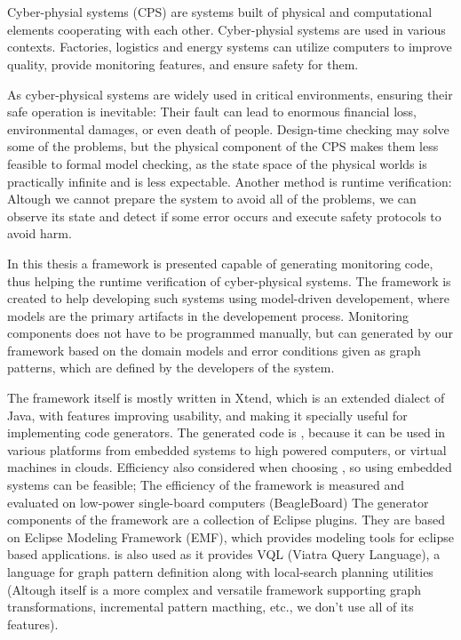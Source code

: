 \chapter{\bevezetes}

Cyber-physial systems (CPS) are systems built of physical and computational elements cooperating with each other.
Cyber-physial systems are used in various contexts. 
Factories, logistics and energy systems can utilize computers to improve quality, provide monitoring features, and ensure safety for them.

As cyber-physical systems are widely used in critical environments, ensuring their safe operation is inevitable: Their fault can lead to enormous financial loss, environmental damages, or even death of people.
Design-time checking may solve some of the problems, but the physical component of the CPS makes them less feasible to formal model checking, as the state space of the physical worlds is practically infinite and is less expectable.
Another method is runtime verification: Altough we cannot prepare the system to avoid all of the problems, we can observe its state and detect if some error occurs and execute safety protocols to avoid harm. 


In this thesis a framework is presented capable of generating monitoring code, thus helping the runtime verification of cyber-physical systems. 
The framework is created to help developing such systems using model-driven developement, where models are the primary artifacts in the developement process.
Monitoring components does not have to be programmed manually, but can generated by our framework based on the domain models and error conditions given as graph patterns, which are defined by the developers of the system.



The framework itself is mostly written in Xtend, which is an extended dialect of Java, with features improving usability, and making it specially useful for implementing code generators. 
The generated code is \cpp{}, because it can be used in various platforms from embedded systems to high powered computers, or virtual machines in clouds. 
Efficiency also considered when choosing \cpp{}, so using embedded systems can be feasible; 
The efficiency of the framework is measured and evaluated on low-power single-board computers (BeagleBoard)  
The generator components of the framework are a collection of Eclipse plugins.
They are based on Eclipse Modeling Framework (EMF), which provides modeling tools for eclipse based applications.
\viatra is also used as it provides VQL (Viatra Query Language), a language for graph pattern definition along with local-search planning utilities (Altough \viatra{} itself is a more complex and versatile framework supporting graph transformations, incremental pattern macthing, etc., we don't use all of its features).

